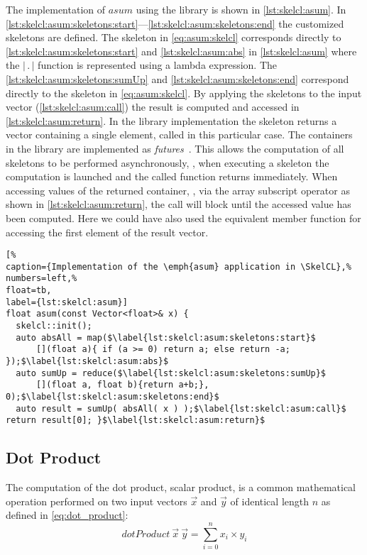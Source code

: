 The implementation of $asum$ using the \SkelCL library is shown in \autoref{lst:skelcl:asum}.
In \autoref{lst:skelcl:asum:skeletons:start}---\autoref{lst:skelcl:asum:skeletons:end} the customized skeletons are defined.
The \map skeleton in \autoref{eq:asum:skelcl} corresponds directly to \autoref{lst:skelcl:asum:skeletons:start} and \autoref{lst:skelcl:asum:abs} in \autoref{lst:skelcl:asum} where the $|\, .\, |$ function is represented using a \Cpp lambda expression.
The \autoref{lst:skelcl:asum:skeletons:sumUp} and \autoref{lst:skelcl:asum:skeletons:end} correspond directly to the \reduce skeleton in \autoref{eq:asum:skelcl}.
By applying the skeletons to the input vector (\autoref{lst:skelcl:asum:call}) the result is computed and accessed in \autoref{lst:skelcl:asum:return}.
In the \SkelCL library implementation the \reduce skeleton returns a vector containing a single element, called  in this particular case.
The containers in the \SkelCL library are implemented as \emph{futures}~\cite{HewittBa1977,FriedmanWi1978}.
This allows the computation of all skeletons to be performed asynchronously, \ie, when executing a skeleton the computation is launched and the called function returns immediately.
When accessing values of the returned container, \eg, via the array subscript operator as shown in \autoref{lst:skelcl:asum:return}, the call will block until the accessed value has been computed.
Here we could have also used the equivalent  member function for accessing the first element of the result vector.

\begin{lstlisting}[%                                                             
caption={Implementation of the \emph{asum} application in \SkelCL},%
numbers=left,%
float=tb,
label={lst:skelcl:asum}]
float asum(const Vector<float>& x) {
  skelcl::init();
  auto absAll = map($\label{lst:skelcl:asum:skeletons:start}$
      [](float a){ if (a >= 0) return a; else return -a; });$\label{lst:skelcl:asum:abs}$
  auto sumUp = reduce($\label{lst:skelcl:asum:skeletons:sumUp}$
      [](float a, float b){return a+b;}, 0);$\label{lst:skelcl:asum:skeletons:end}$
  auto result = sumUp( absAll( x ) );$\label{lst:skelcl:asum:call}$ return result[0]; }$\label{lst:skelcl:asum:return}$
\end{lstlisting}


\subsection*{Dot Product}
\label{sec:dot}
The computation of the dot product, \aka scalar product, is a common mathematical operation performed on two input vectors $\vec{x}$ and $\vec{y}$ of identical length $n$ as defined in \autoref{eq:dot_product}:
\begin{equation}
  dotProduct\ \vec{x}\ \vec{y} = \sum_{i=0}^{n} x_i \times y_i
  \label{eq:dot_product}
\end{equation}

